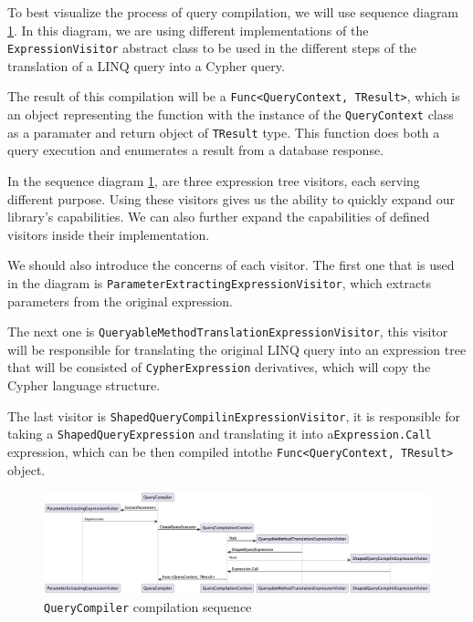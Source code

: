 To best visualize the process of query compilation, we will use sequence diagram \ref{fig:QueryCompilerSequence}.
In this diagram, we are using different implementations of the \texttt{ExpressionVisitor} abstract class to be used in the different steps of the translation of a LINQ query into a Cypher query.

The result of this compilation will be a \texttt{Func<QueryContext, TResult>}, which is an object representing the function with the instance of the \texttt{QueryContext} class as a paramater and return object of \texttt{TResult} type.
This function does both a query execution and enumerates a result from a database response.

In the sequence diagram \ref{fig:QueryCompilerSequence}, are three expression tree visitors, each serving different purpose.
Using these visitors gives us the ability to quickly expand our library's capabilities.
We can also further expand the capabilities of defined visitors inside their implementation.

We should also introduce the concerns of each visitor. The first one that is used in the diagram is \texttt{ParameterExtractingExpressionVisitor},
which extracts parameters from the original expression.

The next one is \texttt{QueryableMethodTranslationExpressionVisitor}, this visitor will
be responsible for translating the original LINQ query into an expression tree that will be consisted of \texttt{CypherExpression} derivatives,
which will copy the Cypher language structure.

The last visitor is \texttt{ShapedQueryCompilinExpressionVisitor}, it is responsible
for taking a \texttt{ShapedQueryExpression} and translating it into a\linebreak \texttt{Expression.Call} expression, which can be then compiled into\linebreak the \texttt{Func<QueryContext, TResult>} object.

\begin{figure}[H]
    \centering
    \includegraphics[width=\textheight, angle=-90]{content/Translation Sequence.png}
    \caption{\texttt{QueryCompiler} compilation sequence}
    \label{fig:QueryCompilerSequence}
\end{figure}

